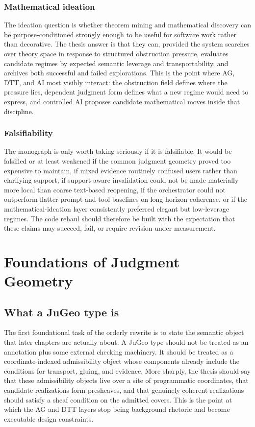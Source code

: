 \documentclass[11pt]{report}
\begin{document}
\section{Mathematical ideation}
The ideation question is whether theorem mining and mathematical discovery can be purpose-conditioned strongly enough to be useful for software work rather than decorative. The thesis answer is that they can, provided the system searches over theory space in response to structured obstruction pressure, evaluates candidate regimes by expected semantic leverage and transportability, and archives both successful and failed explorations. This is the point where AG, DTT, and AI most visibly interact: the obstruction field defines where the pressure lies, dependent judgment form defines what a new regime would need to express, and controlled AI proposes candidate mathematical moves inside that discipline.

\section{Falsifiability}
The monograph is only worth taking seriously if it is falsifiable. It would be falsified or at least weakened if the common judgment geometry proved too expensive to maintain, if mixed evidence routinely confused users rather than clarifying support, if support-aware invalidation could not be made materially more local than coarse text-based reopening, if the orchestrator could not outperform flatter prompt-and-tool baselines on long-horizon coherence, or if the mathematical-ideation layer consistently preferred elegant but low-leverage regimes. The code rehaul should therefore be built with the expectation that these claims may succeed, fail, or require revision under measurement.
\part{Foundations of Judgment Geometry}
\chapter{What a JuGeo type is}
The first foundational task of the orderly rewrite is to state the semantic object that later chapters are actually about. A JuGeo type should not be treated as an annotation plus some external checking machinery. It should be treated as a coordinate-indexed admissibility object whose components already include the conditions for transport, gluing, and evidence. More sharply, the thesis should say that these admissibility objects live over a site of programmatic coordinates, that candidate realizations form presheaves, and that genuinely coherent realizations should satisfy a sheaf condition on the admitted covers. This is the point at which the AG and DTT layers stop being background rhetoric and become executable design constraints.
\end{document}

